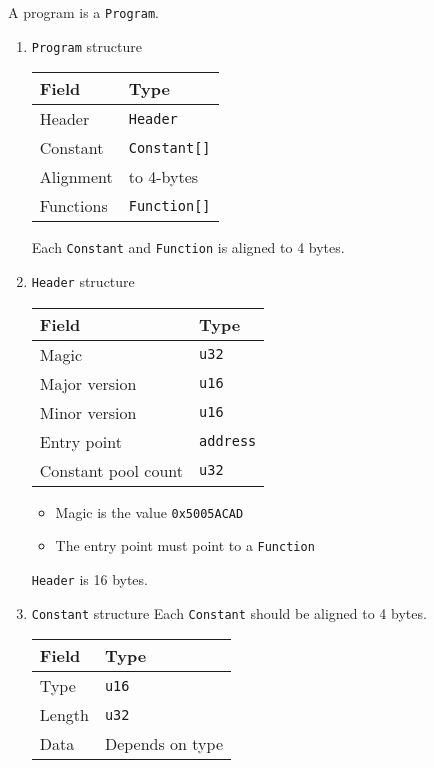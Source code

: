A program is a \texttt{Program}.

\begin{enumerate}
\item \texttt{Program} structure
\label{sec:orgd4a8252}
\begin{center}
\begin{tabular}{ll}
Field & Type\\
\hline
Header & \texttt{Header}\\
Constant & \texttt{Constant[]}\\
Alignment & to 4-bytes\\
Functions & \texttt{Function[]}\\
\end{tabular}
\end{center}

Each \texttt{Constant} and \texttt{Function} is aligned to 4 bytes.

\item \texttt{Header} structure
\label{sec:org1228260}
\begin{center}
\begin{tabular}{ll}
Field & Type\\
\hline
Magic & \texttt{u32}\\
Major version & \texttt{u16}\\
Minor version & \texttt{u16}\\
Entry point & \texttt{address}\\
Constant pool count & \texttt{u32}\\
\end{tabular}
\end{center}

\begin{itemize}
\item Magic is the value \texttt{0x5005ACAD}
\item The entry point must point to a \texttt{Function}
\end{itemize}

\texttt{Header} is 16 bytes.

\item \texttt{Constant} structure
\label{sec:org608f2fc}
Each \texttt{Constant} should be aligned to 4 bytes.

\begin{center}
\begin{tabular}{ll}
Field & Type\\
\hline
Type & \texttt{u16}\\
Length & \texttt{u32}\\
Data & Depends on type\\
\end{tabular}
\end{center}


\end{enumerate}
